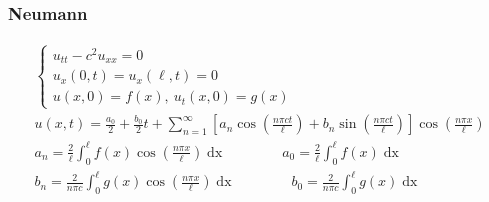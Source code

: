 \documentclass{article}
\begin{document}
\subsubsection*{Neumann}
\begin{gather*}
\begin{cases}
u_{tt} - c^{2}u_{xx} = 0\\
u_{x}(0,t) = u_{x}(\ell,t) = 0\\
u(x,0) = f(x),\ u_{t}(x,0) = g(x)
\end{cases}\\
u(x,t) = \frac{a_{0}}{2} + \frac{b_{0}}{2}t +\sum_{n=1}^{\infty}\left[a_{n}\cos{\left(\frac{n\pi c t}{\ell}\right)} + b_{n}\sin{\left(\frac{n\pi c t}{\ell}\right)}\right]\cos{\left(\frac{n\pi x}{\ell}\right)}\\
a_{n} = \frac{2}{\ell}\int_{0}^{\ell}f(x)\cos{\left(\frac{n\pi x}{\ell}\right)}\mathop{dx}\qquad\qquad
a_{0} = \frac{2}{\ell}\int_{0}^{\ell}f(x)\mathop{dx}\\
b_{n} = \frac{2}{n\pi c}\int_{0}^{\ell}g(x)\cos{\left(\frac{n\pi x}{\ell}\right)}\mathop{dx}\qquad\qquad
b_{0} = \frac{2}{n\pi c}\int_{0}^{\ell}g(x)\mathop{dx}\\
\end{gather*}
\end{document}
